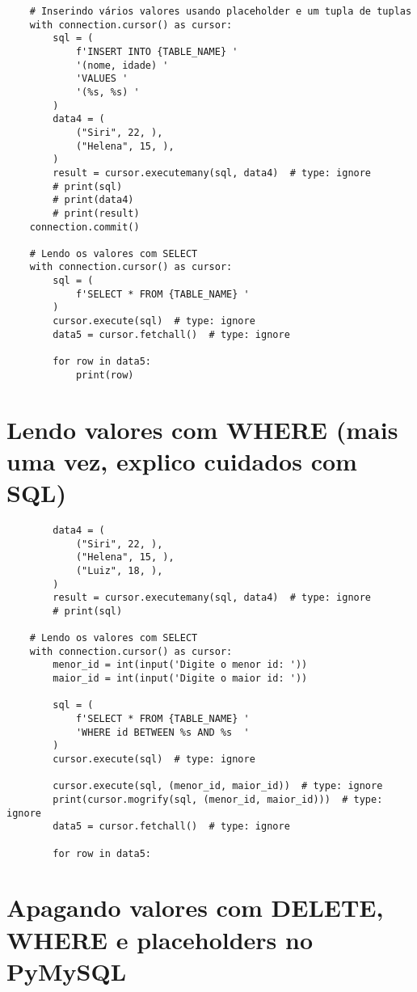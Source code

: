 \documentclass{article}
\begin{document}
\begin{lstlisting}
    # Inserindo vários valores usando placeholder e um tupla de tuplas
    with connection.cursor() as cursor:
        sql = (
            f'INSERT INTO {TABLE_NAME} '
            '(nome, idade) '
            'VALUES '
            '(%s, %s) '
        )
        data4 = (
            ("Siri", 22, ),
            ("Helena", 15, ),
        )
        result = cursor.executemany(sql, data4)  # type: ignore
        # print(sql)
        # print(data4)
        # print(result)
    connection.commit()

    # Lendo os valores com SELECT
    with connection.cursor() as cursor:
        sql = (
            f'SELECT * FROM {TABLE_NAME} '
        )
        cursor.execute(sql)  # type: ignore
        data5 = cursor.fetchall()  # type: ignore

        for row in data5:
            print(row)
    \end{lstlisting}
    
    \section{Lendo valores com WHERE (mais uma vez, explico cuidados com SQL) }
   
    \begin{lstlisting}
        data4 = (
            ("Siri", 22, ),
            ("Helena", 15, ),
            ("Luiz", 18, ),
        )
        result = cursor.executemany(sql, data4)  # type: ignore
        # print(sql)

    # Lendo os valores com SELECT
    with connection.cursor() as cursor:
        menor_id = int(input('Digite o menor id: '))
        maior_id = int(input('Digite o maior id: '))

        sql = (
            f'SELECT * FROM {TABLE_NAME} '
            'WHERE id BETWEEN %s AND %s  '
        )
        cursor.execute(sql)  # type: ignore

        cursor.execute(sql, (menor_id, maior_id))  # type: ignore
        print(cursor.mogrify(sql, (menor_id, maior_id)))  # type: ignore
        data5 = cursor.fetchall()  # type: ignore

        for row in data5:

    \end{lstlisting}


    \section{Apagando valores com DELETE, WHERE e placeholders no PyMySQL}
    
\end{document}
